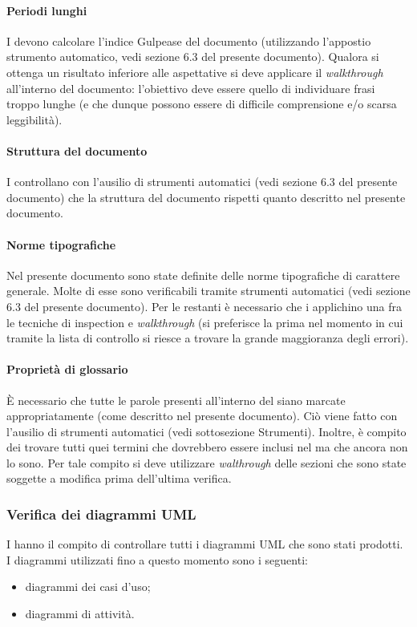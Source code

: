 			\paragraph{Periodi lunghi}
				I  devono calcolare l'indice Gulpease del documento (utilizzando l'appostio strumento automatico, vedi sezione 6.3 del presente documento). Qualora si ottenga un risultato inferiore alle aspettative si deve applicare il \textit{walkthrough} all'interno del documento: l'obiettivo deve essere quello di individuare frasi troppo lunghe (e che dunque possono essere di difficile comprensione e/o scarsa leggibilità).
			\paragraph{Struttura del documento}
				I  controllano con l'ausilio di strumenti automatici (vedi sezione 6.3 del presente documento) che la struttura del documento rispetti quanto descritto nel presente documento.
			\paragraph{Norme tipografiche}
				Nel presente documento sono state definite delle norme tipografiche di carattere generale. Molte di esse sono verificabili tramite strumenti automatici (vedi sezione 6.3 del presente documento). Per le restanti è necessario che i  applichino una fra le tecniche di inspection e \textit{walkthrough}	(si preferisce la prima nel momento in cui tramite la lista di controllo si riesce a trovare la grande maggioranza degli errori).
			\paragraph{Proprietà di glossario}
				È necessario che tutte le parole presenti all'interno del  siano marcate appropriatamente (come descritto nel presente 
				documento). Ciò viene fatto con l'ausilio di strumenti automatici (vedi sottosezione Strumenti). Inoltre, è compito dei  trovare tutti quei termini che dovrebbero essere inclusi nel  ma che ancora non lo sono. Per tale compito si deve utilizzare \textit{walthrough} delle sezioni che sono state soggette a modifica prima dell'ultima verifica.
		\subsubsection{Verifica dei diagrammi UML}
			I  hanno il compito di controllare tutti i diagrammi UML che sono stati prodotti. I diagrammi utilizzati fino a questo momento 
			sono i seguenti:
			\begin{itemize}
				\item diagrammi dei casi d'uso;
				\item diagrammi di attività.
			\end{itemize}
